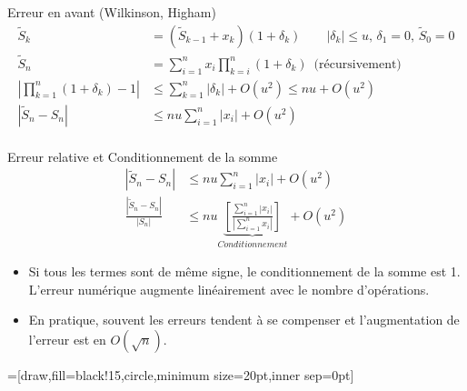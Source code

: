 \documentclass{beamer}
\begin{document}
\begin{frame}{Erreur en avant (Wilkinson, Higham)}
    \begin{align*}
        \widetilde{S}_k                                & = (\widetilde{S}_{k-1}+x_k)(1+\delta_k) \qquad |\delta_k| \le u,\, \delta_1 = 0,\, \widetilde{S}_0 = 0 \\
        \widetilde{S}_n                                & = \sum_{i=1}^n x_i \prod_{k=i}^{n}(1+\delta_k) \, \text { (récursivement) }                            \\
        \left| \prod_{k=1}^n{(1+\delta_k)} - 1 \right| & \le \sum_{k=1}^n{|\delta_k|} + O(u^2) \le nu + O(u^2)                                                  \\
        \left|\widetilde{S}_n - S_n \right|            & \le nu\sum_{i=1}^n{|x_i|} + O(u^2)                                                                     \\
    \end{align*}
\end{frame}

\begin{frame}{Erreur relative et Conditionnement de la somme}
    \begin{align*}
        \left|\widetilde{S}_n - S_n \right|               & \le nu\sum_{i=1}^n{|x_i|} + O(u^2)                                                                                           \\
        \frac{\left|\widetilde{S}_n - S_n \right|}{|S_n|} & \le   nu \underbrace{\left[\frac{\sum_{i=1}^n{|x_i|}}{ \left|\sum_{i=1}^n{x_i} \right|} \right]}_{Conditionnement}  + O(u^2)
    \end{align*}

    \begin{itemize}
        \item Si tous les termes sont de même signe, le conditionnement de la somme est 1.
              L'erreur numérique augmente linéairement avec le nombre d'opérations.
        \item En pratique, souvent les erreurs tendent à se compenser et l'augmentation de l'erreur est en $O(\sqrt{n})$.
    \end{itemize}
\end{frame}

=[draw,fill=black!15,circle,minimum size=20pt,inner sep=0pt]
\end{document}
